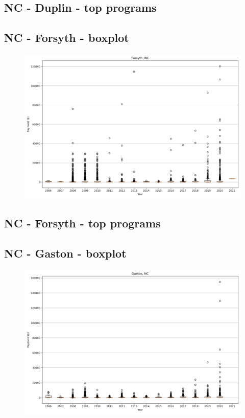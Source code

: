 \subsection*{NC - Duplin - top programs}

\newpage
\subsection*{NC - Forsyth - boxplot}
\begin{figure}[h]
\centering
\includegraphics[width=7in]{../output/boxplots/counties/Forsyth-NC_boxplot.png}
\end{figure}


\subsection*{NC - Forsyth - top programs}

\newpage
\subsection*{NC - Gaston - boxplot}
\begin{figure}[h]
\centering
\includegraphics[width=7in]{../output/boxplots/counties/Gaston-NC_boxplot.png}
\end{figure}


